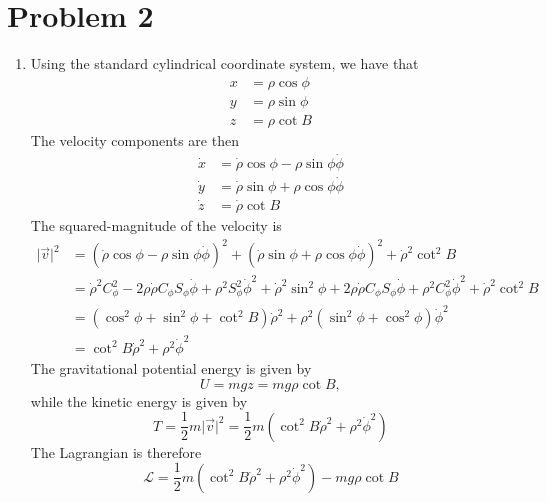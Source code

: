 \documentclass[12pt]{article}
\newcommand{\magsq}[1]{\big|#1\big|^2}
\begin{document}
\begin{enumerate}[label=(\alph*)]
\end{enumerate}


\section*{Problem 2}
\begin{enumerate}[label=(\alph*)]
    \item Using the standard cylindrical coordinate system, we have that
    \begin{align*}
        x &= \rho\cos\phi \\
        y &= \rho\sin\phi \\
        z &= \rho\cot B
    \end{align*}
    The velocity components are then
    \begin{align*}
        \dot{x} &= \dot{\rho}\cos\phi - \rho\sin\phi\dot{\phi} \\
        \dot{y} &= \dot{\rho}\sin\phi + \rho\cos\phi\dot{\phi} \\
        \dot{z} &= \dot{\rho}\cot B
    \end{align*}
    The squared-magnitude of the velocity is
    \begin{align*}
        \magsq{\vec{v}} &= \left(\dot{\rho}\cos\phi - \rho\sin\phi\dot{\phi}\right)^2 + \left(\dot{\rho}\sin\phi + \rho\cos\phi\dot{\phi}\right)^2 + \dot{\rho}^2\cot^2B \\
        &= \dot{\rho}^2C_\phi^2 - 2\rho\dot{\rho}C_\phi S_\phi\dot{\phi} + \rho^2S_\phi^2\dot{\phi}^2 + \dot{\rho}^2\sin^2\phi + 2\rho\dot{\rho}C_\phi S_\phi\dot{\phi} + \rho^2C_\phi^2\dot{\phi}^2 + \dot{\rho}^2\cot^2 B \\
        &= \left(\cos^2\phi + \sin^2\phi + \cot^2 B\right)\dot{\rho}^2 + \rho^2\left(\sin^2\phi + \cos^2\phi\right)\dot{\phi}^2 \\
        &= \cot^2 B\dot{\rho}^2 + \rho^2\dot{\phi}^2
    \end{align*}
    The gravitational potential energy is given by
    \[ U = mgz = mg\rho\cot B, \]
    while the kinetic energy is given by
    \[ T = \frac{1}{2}m\magsq{\vec{v}} = \frac{1}{2}m\left(\cot^2 B\dot{\rho}^2 + \rho^2\dot{\phi}^2\right) \]
    The Lagrangian is therefore
    \[ \boxed{\mathscr{L} = \frac{1}{2}m\left(\cot^2 B\dot{\rho}^2 + \rho^2\dot{\phi}^2\right) - mg\rho\cot B} \]


\end{enumerate}
\end{document}
